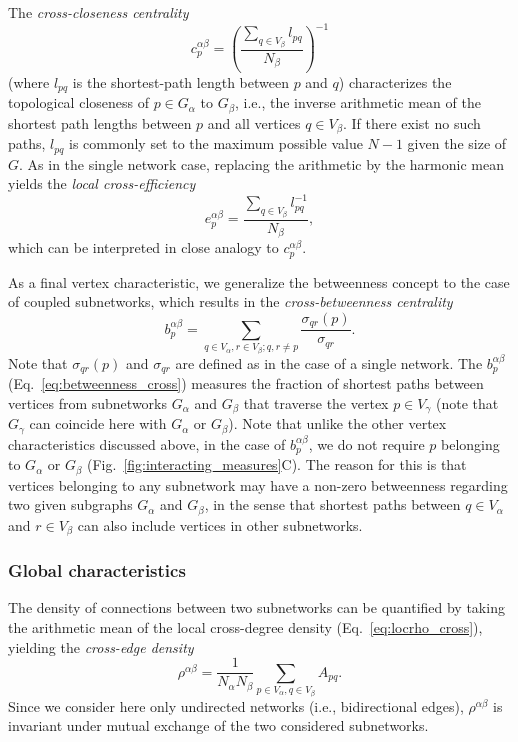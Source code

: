 		The \textit{cross-closeness centrality}
\begin{equation}
{c}_p^{\alpha\beta} = \left(\frac{\sum_{q \in V_\beta} l_{pq}}{N_\beta}\right)^{-1}
\label{eq:closeness_cross}
\end{equation}
\noindent
(where $l_{pq}$ is the shortest-path length between $p$ and $q$) characterizes the topological closeness of $p\in G_\alpha$ to $G_\beta$, i.e., the inverse arithmetic mean of the shortest path lengths between $p$ and all vertices $q\in V_\beta$. If there exist no such paths, $l_{pq}$ is commonly set to the maximum possible value $N-1$ given the size of $G$. As in the single network case, replacing the arithmetic by the harmonic mean yields the \textit{local cross-efficiency}
\begin{equation}
{e}_p^{\alpha\beta} = \frac{\sum_{q \in V_\beta} l_{pq}^{-1}}{N_\beta},
\label{eq:locefficiency_cross}
\end{equation}
\noindent
which can be interpreted in close analogy to ${c}_p^{\alpha\beta}$. 

		As a final vertex characteristic, we generalize the betweenness concept to the case of coupled subnetworks, which results in the \textit{cross-betweenness centrality}
\begin{equation}
{b}_p^{\alpha\beta} = \sum_{q\in V_\alpha,r\in V_\beta;q,r\neq p} \frac{{\sigma}_{qr}(p)}{{\sigma}_{qr}}.
\label{eq:betweenness_cross}
\end{equation}
\noindent
Note that ${\sigma}_{qr}(p)$ and ${\sigma}_{qr}$ are defined as in the case of a single network. The ${b}_p^{\alpha\beta}$ (Eq.~\eqref{eq:betweenness_cross}) measures the fraction of shortest paths between vertices from subnetworks $G_\alpha$ and $G_\beta$ that traverse the vertex $p\in V_\gamma$ (note that $G_\gamma$ can coincide here with $G_\alpha$ or $G_\beta$). Note that unlike the other vertex characteristics discussed above, in the case of ${b}_p^{\alpha\beta}$, we do not require $p$ belonging to $G_\alpha$ or $G_\beta$  (Fig.~\ref{fig:interacting_measures}C). The reason for this is that vertices belonging to any subnetwork may have a non-zero betweenness regarding two given subgraphs $G_\alpha$ and $G_\beta$, in the sense that shortest paths between $q\in V_\alpha$ and $r\in V_\beta$ can also include vertices in other subnetworks. 

		\subsubsection{Global characteristics}
		The density of connections between two subnetworks can be quantified by taking the arithmetic mean of the local cross-degree density (Eq.~\ref{eq:locrho_cross}), yielding the \textit{cross-edge density}
\begin{equation}
{\rho}^{\alpha\beta} = \frac{1}{N_\alpha N_\beta} \sum_{p \in V_\alpha, q \in V_\beta} A_{pq}.
\label{eq:globrho_cross}
\end{equation}
Since we consider here only undirected networks (i.e., bidirectional edges), $\rho^{\alpha\beta}$ is invariant under mutual exchange of the two considered subnetworks.

